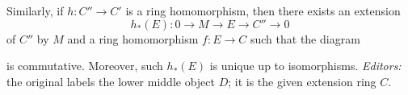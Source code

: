 \documentclass[../main]{subfiles}
\begin{document}
Similarly, if $h:C''\longrightarrow C'$ is a ring homomorphism, then there exists an extension \[h_*(E):0\longrightarrow M\longrightarrow E\longrightarrow C''\longrightarrow0\] of $C''$ by $M$ and a ring homomorphism $f:E\longrightarrow C$ such that the diagram
\begin{center}
\end{center}
is commutative. Moreover, such $h_*(E)$ is unique up to isomorphisms.
\noindent\emph{Editors:} the original labels the lower middle object $D$; it is the given extension ring $C$.
\end{document}
